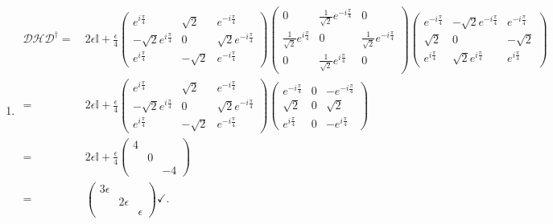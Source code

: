 \documentclass[notitlepage]{report}
\begin{document}
\begin{enumerate}[label=\alph*)]
	\newpage
\item 
	\begin{align*}
		\mathcal{D}\mathcal{H}\mathcal{D}^{\dag} =&\ 2\epsilon\mathbb{I} + \frac{\epsilon}{4}
			\begin{pmatrix}
			e^{i \frac{\pi}{4}} & \sqrt{2}  & e^{-i \frac{\pi}{4}}\\
			 -\sqrt{2}e^{i \frac{\pi}{4}}& 0 & \sqrt{2}e^{-i \frac{\pi}{4}}\\
			 e^{i \frac{\pi}{4}}& -\sqrt{2} & e^{-i \frac{\pi}{4}} 
			\end{pmatrix} 
			\begin{pmatrix}
			0 & \frac{1}{\sqrt{2} }e^{-i \frac{\pi}{4}} & 0\\
			 \frac{1}{\sqrt{2} }e^{i \frac{\pi}{4}}& 0 &\frac{1}{\sqrt{2} }e^{-i \frac{\pi}{4}} \\
			0 & \frac{1}{\sqrt{2} }e^{i \frac{\pi}{4}} & 0
			\end{pmatrix}
			\begin{pmatrix}
			e^{-i \frac{\pi}{4}} & -\sqrt{2}e^{-i \frac{\pi}{4}}  & e^{-i \frac{\pi}{4}}\\
			 \sqrt{2}& 0 & -\sqrt{2}\\
			 e^{i \frac{\pi}{4}}& \sqrt{2}e^{i \frac{\pi}{4}} & e^{i \frac{\pi}{4}} 
			\end{pmatrix}\\ 
			 =&\ 2\epsilon\mathbb{I} + \frac{\epsilon}{4}
			\begin{pmatrix}
			e^{i \frac{\pi}{4}} & \sqrt{2}  & e^{-i \frac{\pi}{4}}\\
			 -\sqrt{2}e^{i \frac{\pi}{4}}& 0 & \sqrt{2}e^{-i \frac{\pi}{4}}\\
			 e^{i \frac{\pi}{4}}& -\sqrt{2} & e^{-i \frac{\pi}{4}} 
			\end{pmatrix}
			\begin{pmatrix}
			e^{-i \frac{\pi}{4}} & 0 & -e^{-i \frac{\pi}{4}}\\
			 \sqrt{2}& 0 & \sqrt{2}\\
			 e^{i \frac{\pi}{4}}& 0 & -e^{i \frac{\pi}{4}} 
			\end{pmatrix} \\
			 =&\ 2\epsilon\mathbb{I} + \frac{\epsilon}{4}
			 \begin{pmatrix}
			 4 &  & \\
			  & 0 & \\
			  &  & -4
			 \end{pmatrix}\\
			 =&\ \boxed{
				 \begin{pmatrix}
				 3\epsilon &  & \\
				  & 2\epsilon & \\
				  &  & \epsilon
				 \end{pmatrix}
			 }\checkmark
	.\end{align*}
\end{enumerate}
\end{document}
